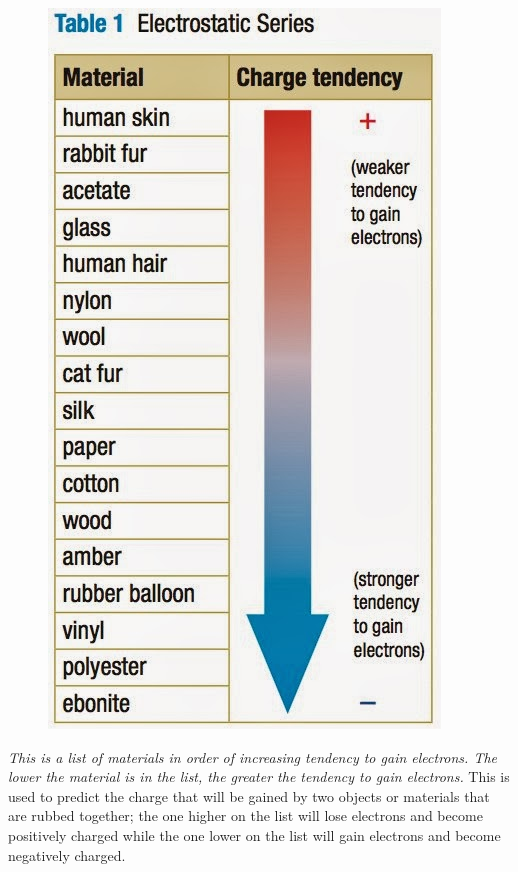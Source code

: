 \documentclass{article}
\begin{document}
    \noindent
    \begin{figure} %
        \centering
        \includegraphics[scale = 0.13]{electrostatic series}
    \end{figure}

    \begin{flushleft}
        \textit{This is a list of materials in order of increasing tendency to gain electrons. The lower the material is in the list, the greater the tendency to gain electrons.} This is used to predict the charge that will be gained by two objects or materials that are rubbed together; the one higher on the list will lose electrons and become positively charged while the one lower on the list will gain electrons and become negatively charged. \\
    \end{flushleft}
\end{document}
